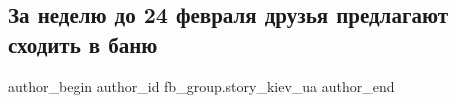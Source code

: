  
 
 
 
 

\subsection{За неделю до 24 февраля друзья   предлагают сходить в баню}
\label{sec:21_02_2023.fb.fb_group.story_kiev_ua.1.za_nedelyu_do_24_fev}

\ifcmt
 author_begin
   author_id fb_group.story_kiev_ua
 author_end
\fi
